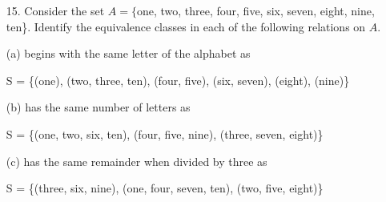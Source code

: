 \documentclass{article}
\begin{document}
\begin{itemize}
    (b) was born in the same city as {\color{blue} symmetric}
    
    (c) likes {\color{blue} symmetric (assuming the other people like them too), reflexive (if the person likes themselves) and transitive (in a friend group of people that all like each other)}
    
    (d) is a relative of {\color{blue} symmetric}
    
    \item[15.] Consider the set $A = \{$one, two, three, four, five, six, seven, eight, nine, ten\}. Identify the equivalence classes in each of the following relations on $A$.
    
    (a) begins with the same letter of the alphabet as
    
    {\color{blue} S = \{(one), (two, three, ten), (four, five), (six, seven), (eight), (nine)\}}
    
    (b) has the same number of letters as
    
    {\color{blue} S = \{(one, two, six, ten), (four, five, nine), (three, seven, eight)\}}
    
    (c) has the same remainder when divided by three as
    
    {\color{blue} S = \{(three, six, nine), (one, four, seven, ten), (two, five, eight)\}}
    
\end{itemize}
\end{document}
